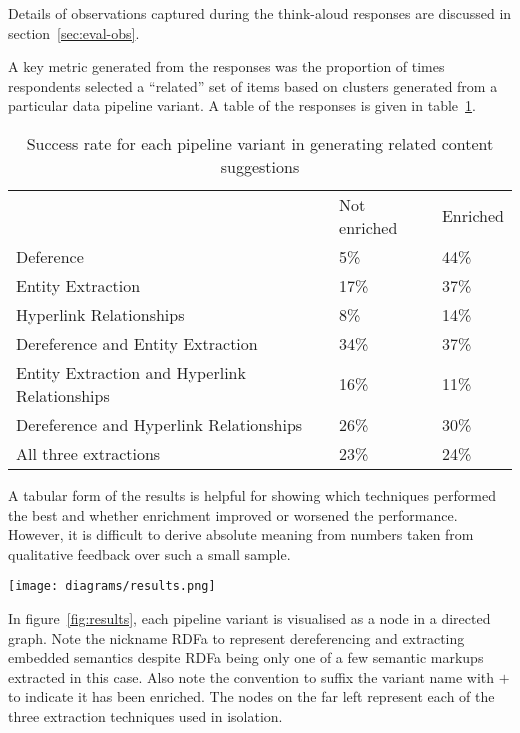 Details of observations captured during the think-aloud responses
are discussed in section~\ref{sec:eval-obs}.

A key metric generated from the responses was the proportion of times
respondents selected a ``related'' set of items based on clusters
generated from a particular data pipeline variant. A table of the
responses is given in table~\ref{tbl:results}.

\begin{table}[h]
  \centering
  \caption{Success rate for each pipeline variant in generating related content suggestions}
  \label{tbl:results}
  \begin{tabular}{lll}
    & Not enriched & Enriched \\
    Deference                                     & 5\%          & 44\%     \\
    Entity Extraction                             & 17\%         & 37\%     \\
    Hyperlink Relationships                       & 8\%          & 14\%     \\
    Dereference and Entity Extraction             & 34\%         & 37\%     \\
    Entity Extraction and Hyperlink Relationships & 16\%         & 11\%     \\
    Dereference and Hyperlink Relationships       & 26\%         & 30\%     \\
    All three extractions                         & 23\%         & 24\%     
  \end{tabular}
\end{table}

A tabular form of the results is helpful for showing which techniques
performed the best and whether enrichment improved or worsened the
performance. However, it is difficult to derive absolute meaning
from numbers taken from qualitative feedback over such a small
sample.

\begin{sidewaysfigure}
  \begin{center}
    \texttt{[image: diagrams/results.png]}
  \end{center}
  \caption{Visualisation of performance of each data pipeline variant\label{fig:results}}
\end{sidewaysfigure}


In figure~\ref{fig:results}, each pipeline variant is visualised
as a node in a directed graph. Note the nickname RDFa to represent
dereferencing and extracting embedded semantics despite RDFa being
only one of a few semantic markups extracted in this case. Also note
the convention to suffix the variant name with $+$ to indicate it
has been enriched. The nodes
on the far left represent each of the three extraction techniques
used in isolation.

